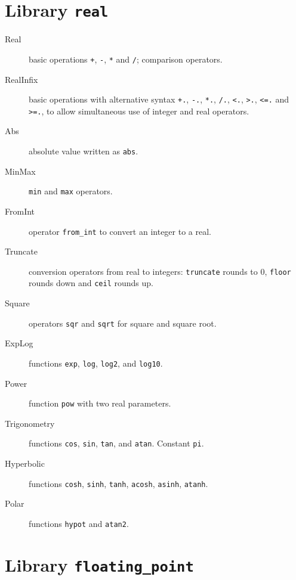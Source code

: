 \section{Library \texttt{real}}

\begin{description}

\item[Real] basic operations \verb|+|, \verb|-|, \verb|*| and \verb|/|;
  comparison operators.

\item[RealInfix] basic operations with alternative syntax \verb|+.|,
  \verb|-.|, \verb|*.|, \verb|/.|, \verb|<.|, \verb|>.|, \verb|<=.| and \verb|>=.|, to
  allow simultaneous use of integer and real operators.

\item[Abs] absolute value written as \verb|abs|.

\item[MinMax] \verb|min| and \verb|max| operators.

\item[FromInt] operator \verb|from_int| to convert an integer to a real.

\item[Truncate] conversion operators from real to integers:
  \verb|truncate| rounds to 0, \verb|floor| rounds down and
  \verb|ceil| rounds up.

\item[Square] operators \verb|sqr| and \verb|sqrt| for square and square root.

\item[ExpLog] functions \verb|exp|, \verb|log|, \verb|log2|, and \verb|log10|.

\item[Power] function \verb|pow| with two real parameters.

\item[Trigonometry] functions \verb|cos|, \verb|sin|, \verb|tan|, and
  \verb|atan|. Constant \verb|pi|.

\item[Hyperbolic] functions \verb|cosh|, \verb|sinh|, \verb|tanh|,
  \verb|acosh|, \verb|asinh|, \verb|atanh|.

\item[Polar] functions \verb|hypot| and \verb|atan2|.

\end{description}

\section{Library \texttt{floating\_point}}

